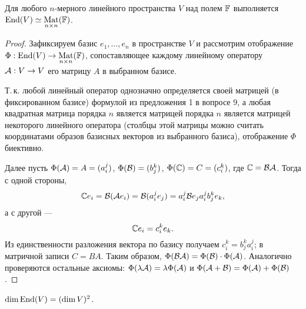 \begin{theorem}
    Для любого $n$-мерного линейного пространства $V$ над полем $\mathbb{F}$ выполняется $\operatorname{End}(V) \simeq \underset{n \times n}{\operatorname{Mat}}(\mathbb{F})$.
\end{theorem}

\begin{proof}
    Зафиксируем базис $e_1, \ldots, e_n$ в пространстве $V$ и рассмотрим отображение $\Phi: \operatorname{End}(V) \to \underset{n \times n}{\operatorname{Mat}}(\mathbb{F})$, сопоставляющее каждому линейному оператору $\mathcal{A}: V \to V$ его матрицу $A$ в выбранном базисе.

    Т.\,к. любой линейный оператор однозначно определяется своей матрицей (в фиксированном базисе) формулой из предложения 1 в вопросе 9, а любая квадратная матрица порядка $n$ является матрицей порядка $n$ является матрицей некоторого линейного оператора (столбцы этой матрицы можно считать координатами образов базисных векторов из выбранного базиса), отображение $\Phi$ биективно.

    Далее пусть $\Phi(\mathcal{A}) = A = (a^j_i)$, $\Phi(\mathcal{B}) = (b^k_j)$, $\Phi(\C) = C = (c^k_i)$, где $\C = \B\A$. Тогда с одной стороны,
    \[
        \C e_i = \B(\A e_i) = \B(a^j_ie_j) = a^j_i\B e_j a^j_ib^k_je_k,
    \]
    а с другой ---
    \[
        \C e_i = c^k_ie_k.
    \]
    Из единственности разложения вектора по базису получаем $c^k_i = b^k_ja^j_i$; в матричной записи $C = BA$. Таким образом, $\Phi(\mathcal{B}\mathcal{A}) = \Phi(\mathcal{B}) \cdot \Phi(\mathcal{A})$. Аналогично проверяются остальные аксиомы: $\Phi(\lambda\mathcal{A}) = \lambda\Phi(\mathcal{A})$ и $\Phi(\mathcal{A} + \mathcal{B}) = \Phi(\mathcal{A}) + \Phi(\mathcal{B})$.
\end{proof}

\begin{corollary}
    $\dim\operatorname{End}(V) = (\dim V)^2$.
\end{corollary}

\renewcommand{\C}{\mathbb{C}}

